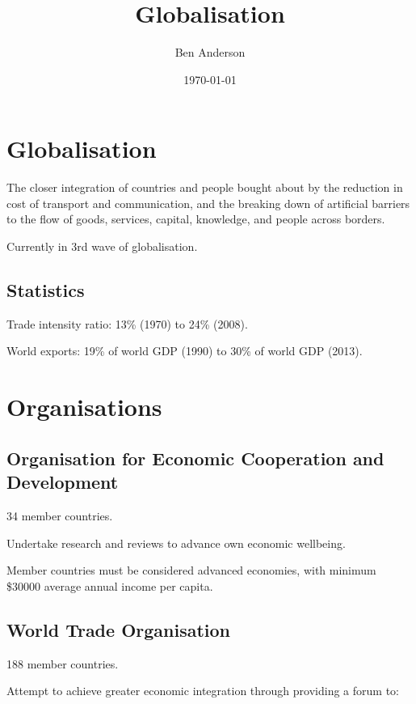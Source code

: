 \documentclass[a4paper,11pt]{article}
\begin{document}
\title{Globalisation}
\author{Ben Anderson}
\date{\today}
\maketitle
\pagebreak

\tableofcontents
\pagebreak


\section{Globalisation}

The closer integration of countries and people bought about by the reduction
in cost of transport and communication, and the breaking down of artificial
barriers to the flow of goods, services, capital, knowledge, and people
across borders.

Currently in 3rd wave of globalisation.


\subsection{Statistics}

Trade intensity ratio: 13\% (1970) to 24\% (2008).

World exports: 19\% of world GDP (1990) to 30\% of world GDP (2013).



\section{Organisations}

\subsection{Organisation for Economic Cooperation and Development}

34 member countries.

Undertake research and reviews to advance own economic wellbeing.

Member countries must be considered advanced economies, with minimum \$30000
average annual income per capita.


\subsection{World Trade Organisation}

188 member countries.

Attempt to achieve greater economic integration through providing a forum to:
\end{document}
